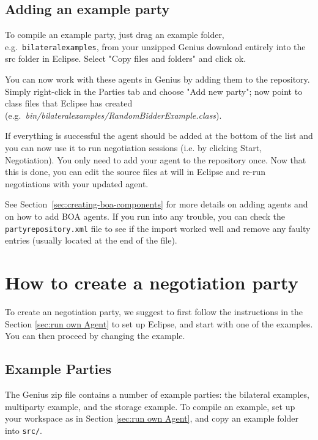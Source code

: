 \documentclass[]{llncs}
\newcommand\Genius{{\sc Genius}}
\begin{document}
\FloatBarrier

\subsection{Adding an example party}
To compile an example party, just drag an example folder, e.g.~\texttt{bilateralexamples}, from your unzipped {\Genius} download entirely into the src folder in Eclipse. Select "Copy files and folders" and click ok. 

You can now work with these agents in {\Genius} by adding them to the repository. Simply right-click in the Parties tab and choose "Add new party"; now point to class files that Eclipse has created (e.g.~\textit{bin/bilateralexamples/RandomBidderExample.class}). 

If everything is successful the agent should be added at the bottom of the list and you can now use it to run negotiation sessions (i.e. by clicking Start, Negotiation). You only need to add your agent to the repository once. Now that this is done, you can edit the source files at will in Eclipse and re-run negotiations with your updated agent.

See Section~\ref{sec:creating-boa-components} for more details on adding agents and on how to add BOA agents.  If you run into any trouble, you can check the \texttt{partyrepository.xml} file to see if the import worked well and remove any faulty entries (usually located at the end of the file).


\section{How to create a negotiation party}\label{sec:createagent}
To create an negotiation party, we suggest to first follow the instructions in the Section \ref{sec:run own Agent} to set up Eclipse, and start with one of the examples.
You can then proceed by changing the example.


\subsection{Example Parties}
The {\Genius} zip file contains a number of example parties: the bilateral examples, multiparty example, and the storage example. To compile an example, set up your workspace as in Section \ref{sec:run own Agent}, and copy an example folder into  \verb|src/|.
\end{document}
